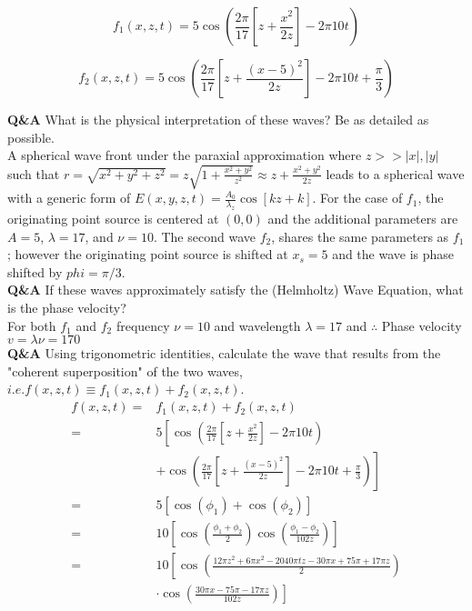 \documentclass[main.tex]{subfiles}
\begin{document}
\begin{equation}\label{eq:ws_1}
f_1(x,z,t) = 5\cos \left(\frac{2 \pi}{17} \left[ z+\frac{x^2}{2z} \right] -2\pi 10t \right)
\end{equation}

\begin{equation}\label{eq:ws_2}
f_2(x,z,t) = 5\cos \left(\frac{2 \pi}{17} \left[ z+\frac{(x-5)^2}{2z} \right] -2\pi 10t + \frac{\pi}{3} \right)
\end{equation}

\textbf{Q\&A} What is the physical interpretation of these waves? Be as detailed as possible.\\

A spherical wave front under the paraxial approximation where $z >> |x|, |y|$ such that $r=\sqrt{x^2 + y^2 + z^2} = z\sqrt{1+\frac{x^2 + y^2}{z^2}} \approx z + \frac{x^2 + y^2}{2z}$ leads to a spherical wave with a generic form of $E(x,y,z,t) = \frac{A_0}{\lambda_z}\cos \left[kz + k \right]$. For the case of $f_1$, the originating point source is centered at $(0,0)$ and the additional parameters are $A=5$, $\lambda = 17$, and $\nu = 10$. The second wave $f_2$, shares the same parameters as $f_1$; however the originating point source is shifted at $x_s=5$ and the wave is phase shifted by $phi=\pi/3$.\\

\textbf{Q\&A} If these waves approximately satisfy the (Helmholtz) Wave Equation, what is the phase velocity?\\

For both $f_1$ and $f_2$ frequency $\nu = 10$ and wavelength $\lambda = 17$ and $\therefore$ Phase velocity $v = \lambda \nu = 170$\\ 

\textbf{Q\&A} Using trigonometric identities, calculate the wave that results from the "coherent superposition" of the two waves, $i.e. f(x,z,t) \equiv f_1(x,z,t) + f_2(x,z,t)$. \\

\begin{equation}\label{eq:ws_3}
\begin{aligned} 
f(x, z, t)=& f_{1}(x, z, t)+f_{2}(x, z, t) \\
          =& 5\left[\cos \left(\frac{2 \pi}{17}\left[z+\frac{x^{2}}{2 z}\right]-2 \pi 10 t\right)\right.\\ 
          &\left.+\cos \left(\frac{2 \pi}{17}\left[z+\frac{(x-5)^{2}}{2 z}\right]-2 \pi 10 t+\frac{\pi}{3}\right)\right] \\
          =& 5\left[\cos \left(\phi_{1}\right)+\cos \left(\phi_{2}\right)\right] \\
          =& 10\left[\cos \left(\frac{\phi_{1}+\phi_{2}}{2}\right) \cos \left(\frac{\phi_{1}-\phi_{2}}{102z}\right)\right] \\
          =& 10\left[\cos \left(\frac{12 \pi z^{2}+6 \pi x^{2}-2040 \pi t z-30 \pi x+75 \pi+17 \pi z}{2}\right)\right.\\ 
          &\left.\cdot \cos \left(\frac{30 \pi x-75 \pi-17 \pi z}{102 z}\right)\right] 
\end{aligned}
\end{equation}
\end{document}
